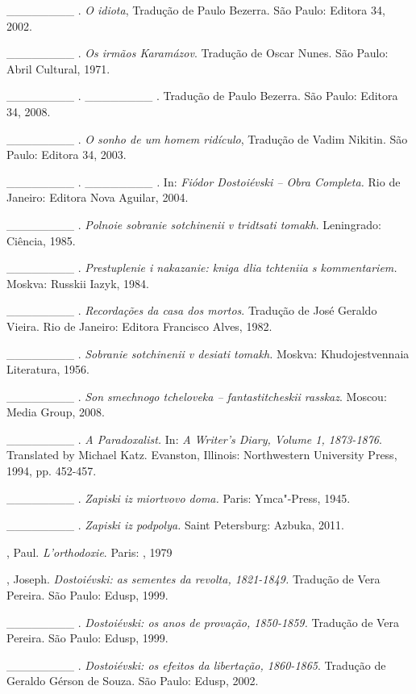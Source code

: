 \begin{Parskip}
\_\_\_\_\_\_\_\_ . \emph{O idiota}, Tradução de Paulo Bezerra. São
Paulo: Editora 34, 2002.

\_\_\_\_\_\_\_\_ . \emph{Os irmãos Karamázov}. Tradução de Oscar Nunes.
São Paulo: Abril Cultural, 1971.

\_\_\_\_\_\_\_\_ . \_\_\_\_\_\_\_\_ . Tradução de Paulo Bezerra. São
Paulo: Editora 34, 2008.

\_\_\_\_\_\_\_\_ . \emph{O sonho de um homem ridículo}, Tradução de
Vadim Nikitin. São Paulo: Editora 34, 2003.

\_\_\_\_\_\_\_\_ . \_\_\_\_\_\_\_\_ \emph{.} In: \emph{Fiódor
Dostoiévski -- Obra Completa.} Rio de Janeiro: Editora Nova Aguilar,
2004.

\_\_\_\_\_\_\_\_ . \emph{Polnoie sobranie sotchinenii v tridtsati
tomakh}. Leningrado: Ciência, 1985.

\_\_\_\_\_\_\_\_ . \emph{Prestuplenie i nakazanie: kniga dlia tchteniia
s kommentariem.} Moskva: Russkii Iazyk, 1984.

\_\_\_\_\_\_\_\_ . \emph{Recordações da casa dos mortos}. Tradução de
José Geraldo Vieira. Rio de Janeiro: Editora Francisco Alves, 1982.

\_\_\_\_\_\_\_\_ . \emph{Sobranie sotchinenii v desiati tomakh.} Moskva:
Khudojestvennaia Literatura, 1956.

\_\_\_\_\_\_\_\_ . \emph{Son smechnogo tcheloveka -- fantastitcheskii
rasskaz}. Moscou:  Media Group, 2008.

\_\_\_\_\_\_\_\_ . \emph{A Paradoxalist.} In: \emph{A Writer's Diary,
Volume 1, 1873-1876}. Translated by Michael Katz. Evanston, Illinois:
Northwestern University Press, 1994, pp. 452-457.

\_\_\_\_\_\_\_\_ . \emph{Zapiski iz miortvovo doma.} Paris: Ymca"-Press,
1945.

\_\_\_\_\_\_\_\_ . \emph{Zapiski iz podpolya.} Saint Petersburg: Azbuka,
2011.

, Paul. \emph{L'orthodoxie}. Paris: , 1979

, Joseph. \emph{Dostoiévski: as sementes da revolta, 1821-1849.}
Tradução de Vera Pereira. São Paulo: Edusp, 1999.

\_\_\_\_\_\_\_\_ . \emph{Dostoiévski: os anos de provação, 1850-1859.}
Tradução de Vera Pereira. São Paulo: Edusp, 1999.

\_\_\_\_\_\_\_\_ . \emph{Dostoiévski: os efeitos da libertação,
1860-1865}. Tradução de Geraldo Gérson de Souza. São Paulo: Edusp, 2002.


\end{Parskip}
